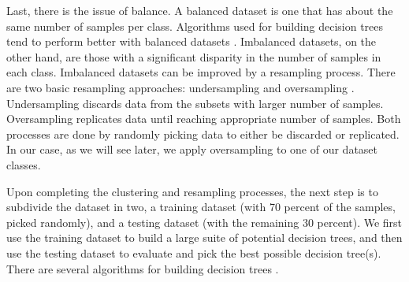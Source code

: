 
Last, there is the issue of balance. A balanced dataset is one that has about the same number of samples per class. Algorithms used for building decision trees tend to perform better with balanced datasets \citep[e.g.,][]{Branco_2016_ACMCS, Weiss_2003_JAIR}. Imbalanced datasets, on the other hand, are those with a significant disparity in the number of samples in each class. Imbalanced datasets can be improved by a resampling process. There are two basic resampling approaches: undersampling and oversampling \citep{Branco_2016_ACMCS}. Undersampling discards data from the subsets with larger number of samples. Oversampling replicates data until reaching appropriate number of samples. Both processes are done by randomly picking data to either be discarded or replicated. In our case, as we will see later, we apply oversampling to one of our dataset classes. 



Upon completing the clustering and resampling processes, the next step is to subdivide the dataset in two, a training dataset (with 70 percent of the samples, picked randomly), and a testing dataset (with the remaining 30 percent). We first use the training dataset to build a large suite of potential decision trees, and then use the testing dataset to evaluate and pick the best possible decision tree(s). There are several algorithms for building decision trees \citep[e.g., ID3, C4.5, C5.0, CART; see][]{Quinlan_1986_ML, Quinlan_1993_Book, Quinlan_1996_JAIR, Breiman_1984_Book}. 

